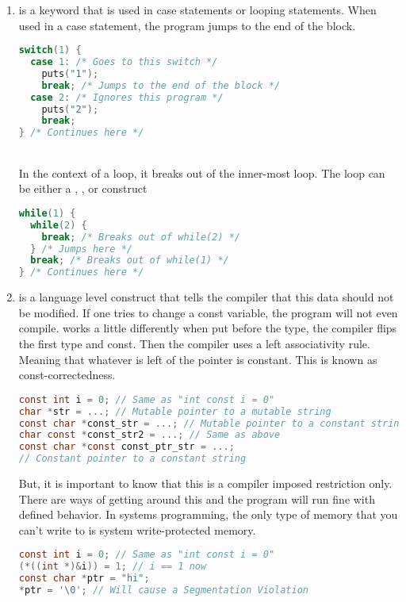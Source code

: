 \begin{enumerate}
	\item {} is a keyword that is used in case statements or looping statements. When used in a case statement, the program jumps to the end of the block.
	      \\
	      \begin{lstlisting}[language=C]
switch(1) {
  case 1: /* Goes to this switch */
    puts("1");
    break; /* Jumps to the end of the block */
  case 2: /* Ignores this program */
    puts("2");
    break;
} /* Continues here */
\end{lstlisting}
	      \\
	      In the context of a loop, it breaks out of the inner-most loop. The loop can be either a , , or  construct
	      \\
	      \begin{lstlisting}[language=C]
while(1) {
  while(2) {
    break; /* Breaks out of while(2) */
  } /* Jumps here */
  break; /* Breaks out of while(1) */
} /* Continues here */
\end{lstlisting}
	\item {} is a language level construct that tells the compiler that this data should not be modified. If one tries to change a const variable, the program will not even compile.  works a little differently when put before the type, the compiler flips the first type and const. Then the compiler uses a left associativity rule. Meaning that whatever is left of the pointer is constant. This is known as const-correctedness.
	      \\
	      \begin{lstlisting}[language=C]
const int i = 0; // Same as "int const i = 0"
char *str = ...; // Mutable pointer to a mutable string
const char *const_str = ...; // Mutable pointer to a constant string
char const *const_str2 = ...; // Same as above
const char *const const_ptr_str = ...;
// Constant pointer to a constant string
\end{lstlisting}

	      But, it is important to know that this is a compiler imposed restriction only. There are ways of getting around this and the program will run fine with defined behavior. In systems programming, the only type of memory that you can't write to is system write-protected memory.

	      \begin{lstlisting}[language=C]
const int i = 0; // Same as "int const i = 0"
(*((int *)&i)) = 1; // i == 1 now
const char *ptr = "hi";
*ptr = '\0'; // Will cause a Segmentation Violation
\end{lstlisting}


\end{enumerate}
